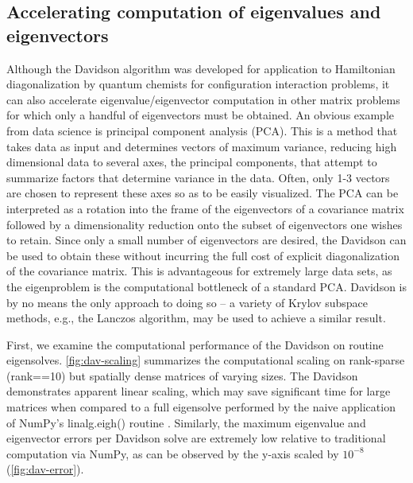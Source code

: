 \documentclass[12pt, fleqn]{article}
\begin{document}
\subsection*{Accelerating computation of eigenvalues and eigenvectors}
Although the Davidson algorithm was developed for application to Hamiltonian diagonalization by quantum chemists for configuration interaction problems, it can also accelerate eigenvalue/eigenvector computation in other matrix problems for which only a handful of eigenvectors must be obtained.
An obvious example from data science is principal component analysis (PCA). 
This is a method that takes data as input and determines vectors of maximum variance, reducing high dimensional data to several axes, the principal components, that attempt to summarize factors that determine variance in the data. 
Often, only 1-3 vectors are chosen to represent these axes so as to be easily visualized. 
The PCA can be interpreted as a rotation into the frame of the eigenvectors of a covariance matrix followed by a dimensionality reduction onto the subset of eigenvectors one wishes to retain. 
Since only a small number of eigenvectors are desired, the Davidson can be used to obtain these without incurring the full cost of explicit diagonalization of the covariance matrix. 
This is advantageous for extremely large data sets, as the eigenproblem is the computational bottleneck of a standard PCA.
Davidson is by no means the only approach to doing so -- a variety of Krylov subspace methods, e.g., the Lanczos algorithm, may be used to achieve a similar result. 

First, we examine the computational performance of the Davidson on routine eigensolves. \autoref{fig:dav-scaling} summarizes the computational scaling on rank-sparse (\textsf{rank==10}) but spatially dense matrices of varying sizes. 
The Davidson demonstrates apparent linear scaling, which may save significant time for large matrices when compared to a full eigensolve performed by the naive application of NumPy's \textsf{linalg.eigh()} routine \cite{numpy}.
Similarly, the maximum eigenvalue and eigenvector errors per Davidson solve are extremely low relative to traditional computation via NumPy, as can be observed by the y-axis scaled by $10^{-8}$ (\autoref{fig:dav-error}).  
\end{document}
